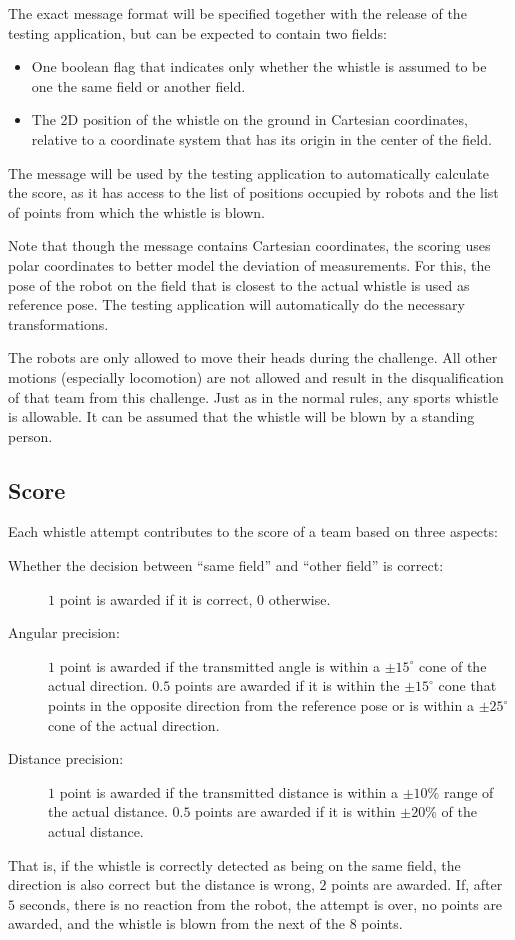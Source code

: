 \documentclass[12pt]{article}
\begin{document}
The exact message format will be specified together with the release of the testing application, but can be expected to contain two fields:
\begin{itemize}
\item One boolean flag that indicates only whether the whistle is assumed to be one the same field or another field.
\item The 2D position of the whistle on the ground in Cartesian coordinates, relative to a coordinate system that has its origin in the center of the field.
\end{itemize}
The message will be used by the testing application to automatically calculate the score, as it has access to the list of positions occupied by robots and the list of points from which the whistle is blown.

Note that though the message contains Cartesian coordinates, the scoring uses polar coordinates to better model the deviation of measurements. For this, the pose of the robot on the field that is closest to the actual whistle is used as reference pose. The testing application will automatically do the necessary transformations.

The robots are only allowed to move their heads during the challenge. All other motions (especially locomotion) are not allowed and result in the disqualification of that team from this challenge. Just as in the normal rules, any sports whistle is allowable. It can be assumed that the whistle will be blown by a standing person.

\subsection{Score}
Each whistle attempt contributes to the score of a team based on three aspects:
\begin{description}
\item[Whether the decision between ``same field'' and ``other field'' is correct:] \(1\) point is awarded if it is correct, \(0\) otherwise.
\item[Angular precision:] \(1\) point is awarded if the transmitted angle is within a \(\pm15^\circ\) cone of the actual direction. \(0.5\) points are awarded if it is within the \(\pm15^\circ\) cone that points in the opposite direction from the reference pose or is within a \(\pm25^\circ\) cone of the actual direction.
\item[Distance precision:] \(1\) point is awarded if the transmitted distance is within a \(\pm10\%\) range of the actual distance. \(0.5\) points are awarded if it is within \(\pm20\%\) of the actual distance.
\end{description}
That is, if the whistle is correctly detected as being on the same field, the direction is also correct but the distance is wrong, \(2\) points are awarded. If, after \(5\) seconds, there is no reaction from the robot, the attempt is over, no points are awarded, and the whistle is blown from the next of the \(8\) points.
\end{document}
